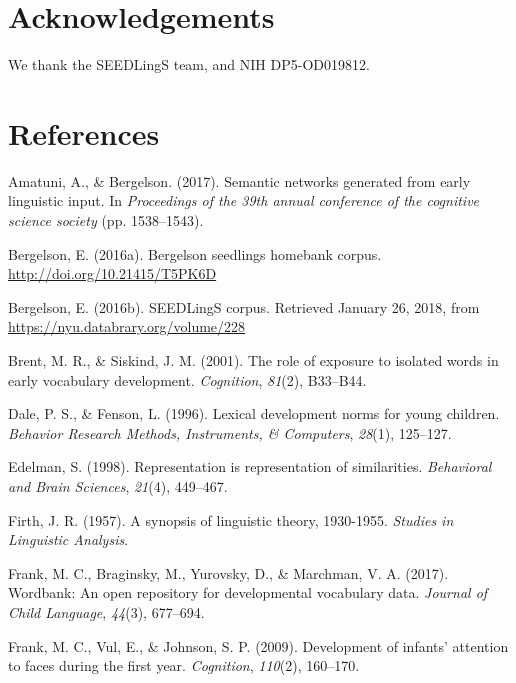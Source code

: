 \documentclass[10pt, letterpaper]{article}
\begin{document}
\section{Acknowledgements}\label{acknowledgements}

We thank the SEEDLingS team, and NIH DP5-OD019812.

\section{References}\label{references}

\setlength{\parindent}{-0.1in} \setlength{\leftskip}{0.125in} \noindent

\hypertarget{refs}{}
\hypertarget{ref-amatuni2017semantic}{}
Amatuni, A., \& Bergelson. (2017). Semantic networks generated from
early linguistic input. In \emph{Proceedings of the 39th annual
conference of the cognitive science society} (pp. 1538--1543).

\hypertarget{ref-bergelson2016seedlings}{}
Bergelson, E. (2016a). Bergelson seedlings homebank corpus.
\url{http://doi.org/10.21415/T5PK6D}

\hypertarget{ref-bergelson2016seedlingsdatabrary}{}
Bergelson, E. (2016b). SEEDLingS corpus. Retrieved January 26, 2018,
from \url{https://nyu.databrary.org/volume/228}

\hypertarget{ref-brent2001role}{}
Brent, M. R., \& Siskind, J. M. (2001). The role of exposure to isolated
words in early vocabulary development. \emph{Cognition}, \emph{81}(2),
B33--B44.

\hypertarget{ref-dale1996lexical}{}
Dale, P. S., \& Fenson, L. (1996). Lexical development norms for young
children. \emph{Behavior Research Methods, Instruments, \& Computers},
\emph{28}(1), 125--127.

\hypertarget{ref-edelman1998representation}{}
Edelman, S. (1998). Representation is representation of similarities.
\emph{Behavioral and Brain Sciences}, \emph{21}(4), 449--467.

\hypertarget{ref-firth1957synopsis}{}
Firth, J. R. (1957). A synopsis of linguistic theory, 1930-1955.
\emph{Studies in Linguistic Analysis}.

\hypertarget{ref-frank2017wordbank}{}
Frank, M. C., Braginsky, M., Yurovsky, D., \& Marchman, V. A. (2017).
Wordbank: An open repository for developmental vocabulary data.
\emph{Journal of Child Language}, \emph{44}(3), 677--694.

\hypertarget{ref-frank2009development}{}
Frank, M. C., Vul, E., \& Johnson, S. P. (2009). Development of infants'
attention to faces during the first year. \emph{Cognition},
\emph{110}(2), 160--170.
\end{document}
